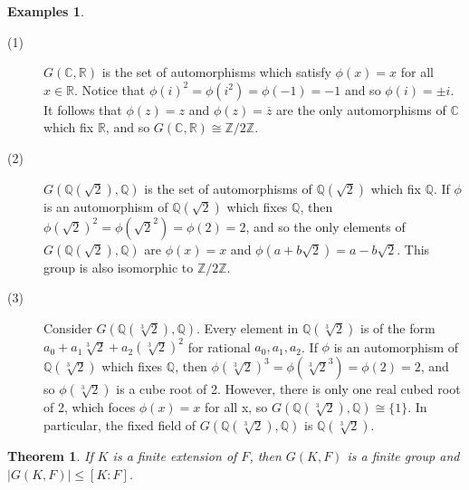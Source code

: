 \documentclass[12pt,leqno]{article}
\numberwithin{equation}{section}
\theoremstyle{plain}
\newtheorem{thm}{Theorem}[section]
\theoremstyle{definition}
\newtheorem*{Exs}{Examples}
\theoremstyle{remark}
\begin{document}
\begin{Exs}\indent
 \begin{description}
  \item [(1)] $G(\mathbb{C},\mathbb{R})$ is the set of automorphisms which satisfy $\phi(x)=x$ for all $x\in\mathbb{R}$. Notice that $\phi(i)^2=\phi(i^2)=\phi(-1)=-1$ and so $\phi(i)=\pm i$. It follows that $\phi(z)=z$ and $\phi(z)=\overline{z}$ are the only automorphisms of $\mathbb{C}$ which fix $\mathbb{R}$, and so $G(\mathbb{C},\mathbb{R})\cong\mathbb{Z}/2\mathbb{Z}$.
  \item [(2)] $G(\mathbb{Q}(\sqrt{2}),\mathbb{Q})$ is the set of automorphisms of $\mathbb{Q}(\sqrt{2})$ which fix $\mathbb{Q}$. If $\phi$ is an automorphism of $\mathbb{Q}(\sqrt{2})$ which fixes $\mathbb{Q}$, then $\phi(\sqrt{2})^2=\phi(\sqrt{2}^2)=\phi(2)=2$, and so the only elements of $G(\mathbb{Q}(\sqrt{2}),\mathbb{Q})$ are $\phi(x)=x$ and $\phi(a+b\sqrt{2})=a-b\sqrt{2}$. This group is also isomorphic to $\mathbb{Z}/2\mathbb{Z}$.
  \item [(3)] Consider $G(\mathbb{Q}(\sqrt[3]{2}),\mathbb{Q})$. Every element in $\mathbb{Q}(\sqrt[3]{2})$ is of the form $a_0+a_1\sqrt[3]{2}+a_2(\sqrt[3]{2})^2$ for rational $a_0,a_1,a_2$. If $\phi$ is an automorphism of $\mathbb{Q}(\sqrt[3]{2})$ which fixes $\mathbb{Q}$, then $\phi(\sqrt[3]{2})^3=\phi(\sqrt[3]{2}^3)=\phi(2)=2$, and so $\phi(\sqrt[3]{2})$ is a cube root of 2. However, there is only one real cubed root of 2, which foces $\phi(x)=x$ for all x, so $G(\mathbb{Q}(\sqrt[3]{2}),\mathbb{Q})\cong\{1\}$. In particular, the fixed field of $G(\mathbb{Q}(\sqrt[3]{2}),\mathbb{Q})$ is $\mathbb{Q}(\sqrt[3]{2})$.
 \end{description}
\end{Exs}

\begin{thm}
 If $K$ is a finite extension of $F$, then $G(K,F)$ is a finite group and $|G(K,F)|\leq[K:F]$.
\end{thm}
\end{document}
